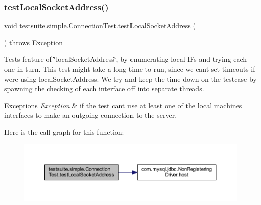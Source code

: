 \subsubsection{\texorpdfstring{test\+Local\+Socket\+Address()}{testLocalSocketAddress()}}
{\footnotesize\ttfamily void testsuite.\+simple.\+Connection\+Test.\+test\+Local\+Socket\+Address (\begin{DoxyParamCaption}{ }\end{DoxyParamCaption}) throws Exception}

Tests feature of \char`\"{}local\+Socket\+Address\char`\"{}, by enumerating local IF\textquotesingle{}s and trying each one in turn. This test might take a long time to run, since we can\textquotesingle{}t set timeouts if we\textquotesingle{}re using local\+Socket\+Address. We try and keep the time down on the testcase by spawning the checking of each interface off into separate threads.


\begin{DoxyExceptions}{Exceptions}
{\em Exception} & if the test can\textquotesingle{}t use at least one of the local machine\textquotesingle{}s interfaces to make an outgoing connection to the server. \\
\hline
\end{DoxyExceptions}
Here is the call graph for this function\+:
\nopagebreak
\begin{figure}[H]
\begin{center}
\leavevmode
\includegraphics[width=350pt]{classtestsuite_1_1simple_1_1_connection_test_af716a61440ab4bf588f5160f6ca5aafb_cgraph}
\end{center}
\end{figure}
\mbox{\label{classtestsuite_1_1simple_1_1_connection_test_a8965be404ac9488d5926ecd89eaeb919}} 
